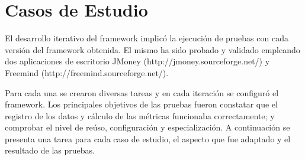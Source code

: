 \section{Casos de Estudio}
\label{sec:casos_de_estudio}
 
 El desarrollo iterativo del framework implicó la ejecución de pruebas con cada versión del framework obtenida. El mismo ha sido probado y validado empleando dos aplicaciones de escritorio JMoney (http://jmoney.sourceforge.net/) y Freemind (http://freemind.sourceforge.net/). 
 
%
%
%
%

Para cada una se crearon diversas tareas y en cada iteración se configuró el framework. Los principales objetivos de las pruebas fueron constatar que el registro de los datos y cálculo de las métricas funcionaba correctamente; y comprobar el nivel de reúso, configuración y especialización. A continuación se presenta una tarea para cada caso de estudio, el aspecto que fue adaptado  y el resultado de las pruebas.


